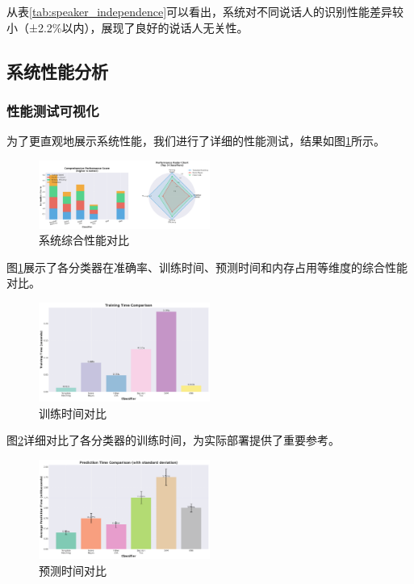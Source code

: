 \documentclass[sigconf,nonacm]{acmart}
\begin{document}
从表\ref{tab:speaker_independence}可以看出，系统对不同说话人的识别性能差异较小（±2.2\%以内），展现了良好的说话人无关性。

\subsection{系统性能分析}

\subsubsection{性能测试可视化}

为了更直观地展示系统性能，我们进行了详细的性能测试，结果如图\ref{fig:performance_comprehensive}所示。

\begin{figure}[htbp]
\centering
\includegraphics[width=0.5\textwidth]{performance/comprehensive_performance.png}
\caption{系统综合性能对比}
\label{fig:performance_comprehensive}
\end{figure}

图\ref{fig:performance_comprehensive}展示了各分类器在准确率、训练时间、预测时间和内存占用等维度的综合性能对比。

\begin{figure}[htbp]
\centering
\includegraphics[width=0.5\textwidth]{performance/training_time.png}
\caption{训练时间对比}
\label{fig:training_time}
\end{figure}

图\ref{fig:training_time}详细对比了各分类器的训练时间，为实际部署提供了重要参考。

\begin{figure}[htbp]
\centering
\includegraphics[width=0.5\textwidth]{performance/prediction_time.png}
\caption{预测时间对比}
\label{fig:prediction_time}
\end{figure}
\end{document}
